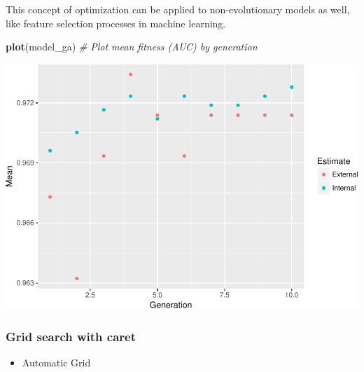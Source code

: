 \documentclass[]{article}
\newenvironment{Shaded}{\begin{snugshade}}{\end{snugshade}}
\newcommand{\KeywordTok}[1]{\textcolor[rgb]{0.13,0.29,0.53}{\textbf{{#1}}}}
\newcommand{\DecValTok}[1]{\textcolor[rgb]{0.00,0.00,0.81}{{#1}}}
\newcommand{\StringTok}[1]{\textcolor[rgb]{0.31,0.60,0.02}{{#1}}}
\newcommand{\CommentTok}[1]{\textcolor[rgb]{0.56,0.35,0.01}{\textit{{#1}}}}
\newcommand{\NormalTok}[1]{{#1}}
\providecommand{\tightlist}{%
  \setlength{\itemsep}{0pt}\setlength{\parskip}{0pt}}
\begin{document}
This concept of optimization can be applied to non-evolutionary models
as well, like feature selection processes in machine learning.

\begin{Shaded}
\begin{Highlighting}[]
\KeywordTok{plot}\NormalTok{(model_ga) }\CommentTok{# Plot mean fitness (AUC) by generation}
\end{Highlighting}
\end{Shaded}

\includegraphics{webinar_code_files/figure-latex/unnamed-chunk-33-1.pdf}

\begin{Shaded}
\end{Shaded}

\subsubsection{Grid search with caret}\label{grid-search-with-caret}

\begin{itemize}
\tightlist
\item
  Automatic Grid
\end{itemize}
\end{document}
